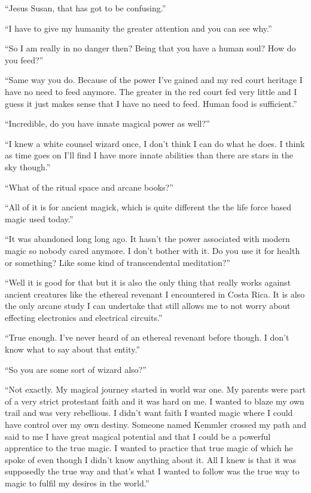 ``Jesus Susan, that has got to be confusing.''

``I have to give my humanity the greater attention and you can see why.''

``So I am really in no danger then? Being that you have a human soul? How do you feed?''

``Same way you do. Because of the power I've gained and my red court heritage I have no need to feed anymore. The greater in the red court fed very little and I guess it just makes sense that I have no need to feed. Human food is sufficient.''

``Incredible, do you have innate magical power as well?''

``I knew a white counsel wizard once, I don't think I can do what he does. I think as time goes on I'll find I have more innate abilities than there are stars in the sky though.''

``What of the ritual space and arcane books?''

``All of it is for ancient magick, which is quite different the the life force based magic used today.''

``It was abandoned long long ago. It hasn't the power associated with modern magic so nobody cared anymore. I don't bother with it. Do you use it for health or something? Like some kind of transcendental meditation?''

``Well it is good for that but it is also the only thing that really works against ancient creatures like the ethereal revenant I encountered in Costa Rica. It is also the only arcane study I can undertake that still allows me to not worry about effecting electronics and electrical circuits.''

``True enough. I've never heard of an ethereal revenant before though. I don't know what to say about that entity.''

``So you are some sort of wizard also?''

``Not exactly. My magical journey started in world war one. My parents were part of a very strict protestant faith and it was hard on me. I wanted to blaze my own trail and was very rebellious. I didn't want faith I wanted magic where I could have control over my own destiny. Someone named Kemmler crossed my path and said to me I have great magical potential and that I could be a powerful apprentice to the true magic. I wanted to practice that true magic of which he spoke of even though I didn't know anything about it. All I knew is that it was supposedly the true way and that's what I wanted to follow was the true way to magic to fulfil my desires in the world.''

